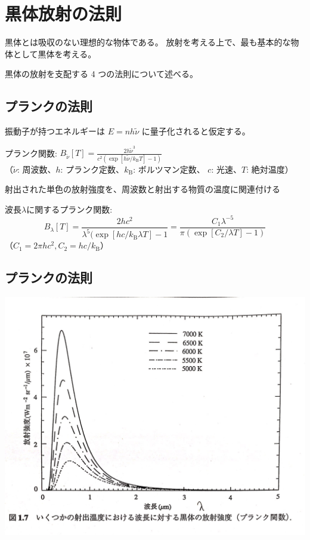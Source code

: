 \documentclass[article,nontitlepage,]{dennou777}
\begin{document}
\section{黒体放射の法則}

黒体とは吸収のない理想的な物体である。
放射を考える上で、最も基本的な物体として黒体を考える。

黒体の放射を支配する 4 つの法則について述べる。

\subsection{プランクの法則}
振動子が持つエネルギーは $E=nh\tilde{\nu}$ に量子化されると仮定する。

プランク関数: $\displaystyle B_{\tilde{\nu}}[T]=\frac{2h\tilde{\nu}^3}{c^2(\exp[h\tilde{\nu}/k_\mathrm{B}T]-1)}$\\
{\scriptsize （$\tilde{\nu}$: 周波数、$h$: プランク定数、$k_\mathrm{B}$: ボルツマン定数、
$c$: 光速、$T$: 絶対温度）}

射出された単色の放射強度を、周波数と射出する物質の温度に関連付ける

波長$\lambda$に関するプランク関数:
\[B_\lambda[T]=\frac{2hc^2}{\lambda^5(\exp[hc/k_\mathrm{B}\lambda T]-1}=
	\frac{C_1\lambda^{-5}}{\pi(\exp[C_2/\lambda T]-1)}\]
{\scriptsize （$C_1=2\pi hc^2, C_2=hc/k_\mathrm{B}$）}

\subsection{プランクの法則}
\includegraphics[width=\textwidth]{planck.jpg}
\end{document}
